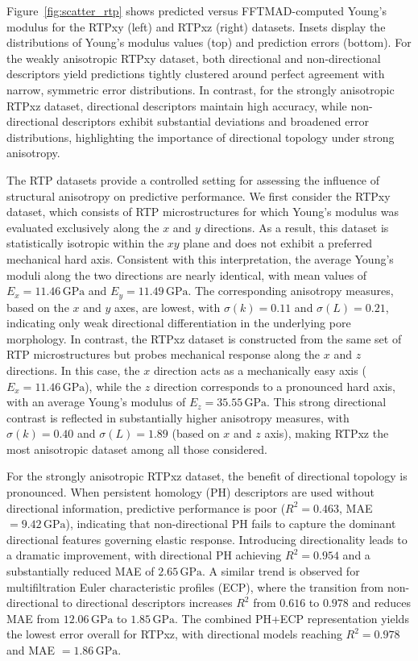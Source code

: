 \documentclass[sn-mathphys,Numbered]{sn-jnl}
\theoremstyle{definition}
\begin{document}
Figure~\ref{fig:scatter_rtp} shows predicted versus FFTMAD-computed Young’s modulus for the RTPxy (left) and RTPxz (right) datasets. Insets display the distributions of Young’s modulus values (top) and prediction errors (bottom). For the weakly anisotropic RTPxy dataset, both directional and non-directional descriptors yield predictions tightly clustered around perfect agreement with narrow, symmetric error distributions. In contrast, for the strongly anisotropic RTPxz dataset, directional descriptors maintain high accuracy, while non-directional descriptors exhibit substantial deviations and broadened error distributions, highlighting the importance of directional topology under strong anisotropy.

The RTP datasets provide a controlled setting for assessing the influence of
structural anisotropy on predictive performance.
We first consider the RTPxy dataset, which consists of RTP microstructures for which Young’s modulus was evaluated exclusively
along the $x$ and $y$ directions.
As a result, this dataset is statistically isotropic within the $xy$ plane and
does not exhibit a preferred mechanical hard axis.
Consistent with this interpretation, the average Young’s moduli along the two
directions are nearly identical, with mean values of
$E_x = 11.46\,\mathrm{GPa}$ and $E_y = 11.49\,\mathrm{GPa}$.
The corresponding anisotropy measures, based on the $x$ and $y$ axes, are lowest, with $\sigma(k)=0.11$ and $\sigma(L)=0.21$, indicating only
weak directional differentiation in the underlying pore morphology.
In contrast, the RTPxz dataset is constructed from the same set of RTP
microstructures but probes mechanical response along the $x$ and $z$
directions.
In this case, the $x$ direction acts as a mechanically easy axis
($E_x = 11.46\,\mathrm{GPa}$), while the $z$ direction corresponds to a
pronounced hard axis, with an average Young’s modulus of
$E_z = 35.55\,\mathrm{GPa}$.
This strong directional contrast is reflected in substantially higher
anisotropy measures, with $\sigma(k)=0.40$ and $\sigma(L)=1.89$
(based on $x$ and $z$ axis), making RTPxz the most anisotropic dataset among all
those considered.


For the strongly anisotropic RTPxz dataset, the benefit of directional topology
is pronounced.
When persistent homology (PH) descriptors are used without directional
information, predictive performance is poor ($R^2=0.463$, MAE $=9.42\,\mathrm{GPa}$),
indicating that non-directional PH fails to capture the dominant directional
features governing elastic response.
Introducing directionality leads to a dramatic improvement, with directional PH
achieving $R^2=0.954$ and a substantially reduced MAE of $2.65\,\mathrm{GPa}$.
A similar trend is observed for multifiltration Euler characteristic profiles
(ECP), where the transition from non-directional to directional descriptors
increases $R^2$ from $0.616$ to $0.978$ and reduces MAE from $12.06\,\mathrm{GPa}$ to $1.85\,\mathrm{GPa}$.
The combined PH+ECP representation yields the lowest error overall for RTPxz,
with directional models reaching $R^2=0.978$ and MAE $=1.86\,\mathrm{GPa}$.
\end{document}
